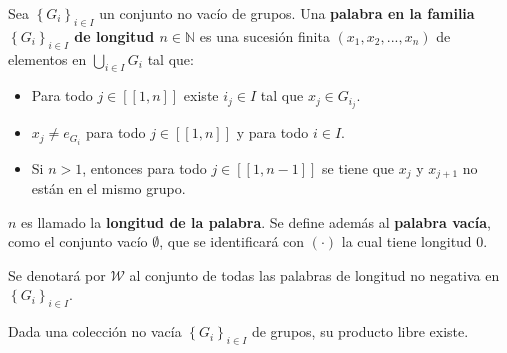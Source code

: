 \documentclass[12pt]{report}
\newcounter{it}
\theoremstyle{largebreak}
\newcommand\natint[1]{\ensuremath{\left[\!\left[ #1\right]\!\right]}}
\begin{document}
    \begin{mydef}
        Sea $\left\{ G_i \right\}_{ i\in I}$ un conjunto no vacío de grupos. Una \textbf{palabra en la familia $\left\{ G_i \right\}_{ i\in I}$ de longitud $n\in\mathbb{N}$} es una sucesión finita $(x_1,x_2,...,x_n)$ de elementos en $\bigcup_{ i\in I}G_i$ tal que:
        \begin{itemize}
            \item Para todo $j\in\natint{1,n}$ existe $i_j\in I$ tal que $x_j\in G_{ i_j}$.
            \item $x_j\neq e_{ G_i}$ para todo $j\in\natint{1,n}$ y para todo $i\in I$.
            \item Si $n>1$, entonces para todo $j\in\natint{1,n-1}$ se tiene que $x_j$ y $x_{ j+1}$ no están en el mismo grupo.
        \end{itemize}
        $n$ es llamado la \textbf{longitud de la palabra}. Se define además al \textbf{palabra vacía}, como el conjunto vacío $\emptyset$, que se identificará con $(\cdot)$ la cual tiene longitud 0.

        Se denotará por $\mathscr{W}$ al conjunto de todas las palabras de longitud no negativa en $\left\{G_i \right\}_{ i\in I}$.
    \end{mydef}

    \begin{theor}
        Dada una colección no vacía $\left\{ G_i \right\}_{ i\in I}$ de grupos, su producto libre existe.
    \end{theor}
    
\end{document}
